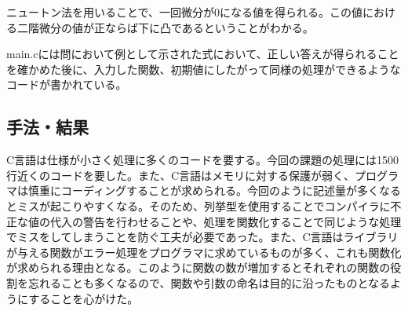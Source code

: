 \documentclass[11pt, oneside]{jsarticle}   	%
\begin{document}
    ニュートン法を用いることで、一回微分が0になる値を得られる。この値における二階微分の値が正ならば下に凸であるということがわかる。

    main.cには問において例として示された式において、正しい答えが得られることを確かめた後に、入力した関数、初期値にしたがって同様の処理ができるようなコードが書かれている。

     
\subsection*{手法・結果}
    C言語は仕様が小さく処理に多くのコードを要する。今回の課題の処理には1500行近くのコードを要した。また、C言語はメモリに対する保護が弱く、プログラマは慎重にコーディングすることが求められる。今回のように記述量が多くなるとミスが起こりやすくなる。そのため、列挙型を使用することでコンパイラに不正な値の代入の警告を行わせることや、処理を関数化することで同じような処理でミスをしてしまうことを防ぐ工夫が必要であった。また、C言語はライブラリが与える関数がエラー処理をプログラマに求めているものが多く、これも関数化が求められる理由となる。このように関数の数が増加するとそれぞれの関数の役割を忘れることも多くなるので、関数や引数の命名は目的に沿ったものとなるようにすることを心がけた。
     
\begin{thebibliography}{9}
\end{thebibliography}
\end{document}
